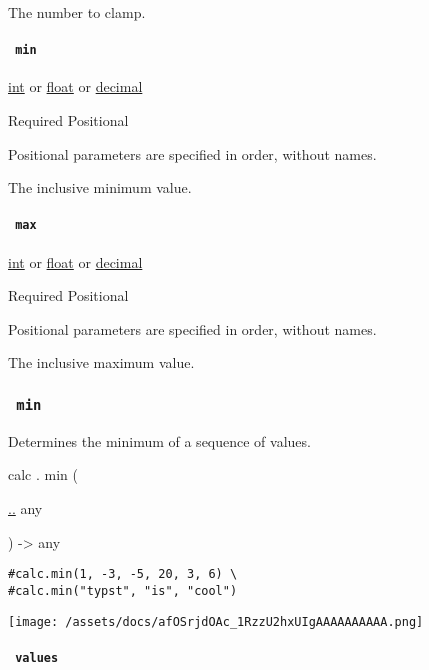 The number to clamp.

\paragraph{\texorpdfstring{\texttt{\ min\ }}{ min }}\label{functions-clamp-min}

\href{/docs/reference/foundations/int/}{int} {or}
\href{/docs/reference/foundations/float/}{float} {or}
\href{/docs/reference/foundations/decimal/}{decimal}

{Required} {{ Positional }}

\label{functions-clamp-min-positional-tooltip}
Positional parameters are specified in order, without names.

The inclusive minimum value.

\paragraph{\texorpdfstring{\texttt{\ max\ }}{ max }}\label{functions-clamp-max}

\href{/docs/reference/foundations/int/}{int} {or}
\href{/docs/reference/foundations/float/}{float} {or}
\href{/docs/reference/foundations/decimal/}{decimal}

{Required} {{ Positional }}

\label{functions-clamp-max-positional-tooltip}
Positional parameters are specified in order, without names.

The inclusive maximum value.

\subsubsection{\texorpdfstring{\texttt{\ min\ }}{ min }}\label{functions-min}

Determines the minimum of a sequence of values.

calc { . } { min } (

{ \hyperref[functions-min-parameters-values]{..} { any } }

) -\textgreater{} { any }

\begin{verbatim}
#calc.min(1, -3, -5, 20, 3, 6) \
#calc.min("typst", "is", "cool")
\end{verbatim}

\texttt{[image: /assets/docs/afOSrjdOAc\_1RzzU2hxUIgAAAAAAAAAA.png]}

\paragraph{\texorpdfstring{\texttt{\ values\ }}{ values }}\label{functions-min-values}

